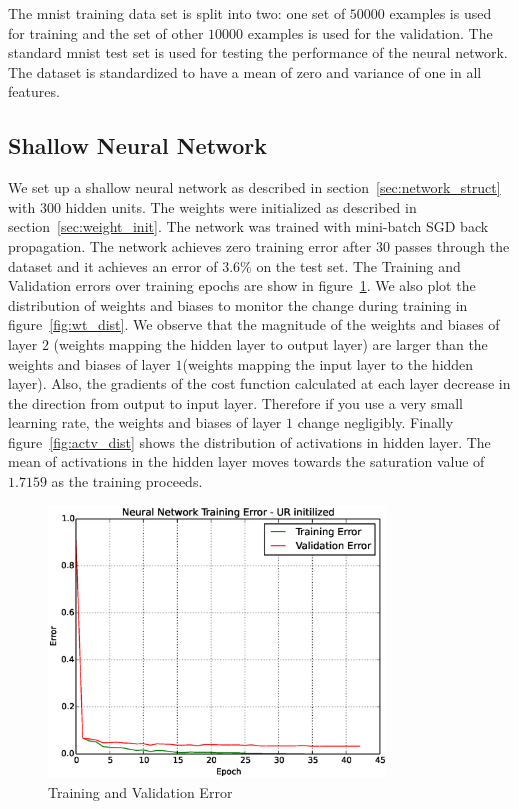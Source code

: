 \documentclass[Proceedings]{ascelike}
\begin{document}
 The mnist training data set is split into two: one set of
$50000$ examples is used for training and the set of other $10000$ examples is
used for the validation. The standard mnist test set is used for testing the
performance of the neural network. The dataset is standardized to have a mean
of zero and variance of one in all features.  \subsection{Shallow Neural
Network} We set up a shallow neural network as described in
section~\ref{sec:network_struct} with $300$ hidden units. The weights were
initialized as described in section~\ref{sec:weight_init}. The network was
trained with mini-batch SGD back propagation. The network achieves zero
training error after $30$ passes through the dataset and it achieves an error
of $3.6\%$ on the test set. The Training and Validation errors over training
epochs are show in figure~\ref{fig:sn_test_err}. We also plot the distribution
of weights and biases to  monitor the change during training in
figure~\ref{fig:wt_dist}.  We observe that the magnitude of the weights and
biases of layer $2$ (weights mapping the hidden layer to output layer) are
larger than the weights and biases of layer $1$(weights mapping the input layer to the
hidden layer).  Also, the gradients of the cost function calculated at each
layer decrease in the direction from output to input layer.  Therefore if you
use a very small learning rate, the weights and biases of layer $1$ change
negligibly.  Finally figure~\ref{fig:actv_dist} shows the distribution of
activations in hidden layer. The mean of activations in the hidden layer
moves towards the saturation value of $1.7159$ as the training proceeds.

\begin{figure} \caption{Training and Validation Error}
\label{fig:sn_test_err} \centering \includegraphics[width=0.8\textwidth,
keepaspectratio]{shallownet_perf.eps} \end{figure}
\end{document}
